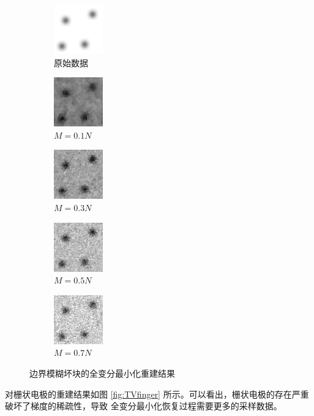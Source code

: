 \begin{figure}
\centering
\begin{subfigure}[t]{1.1in}
	\includegraphics{Figure/testdata/2dsmooth.png}
	\caption{原始数据}
\end{subfigure}
\begin{subfigure}[t]{1.1in}
	\includegraphics{Figure/TV/2dsmooth10.png}
	\caption{$M = 0.1 N$}
\end{subfigure}
\begin{subfigure}[t]{1.1in}
	\includegraphics{Figure/TV/2dsmooth30.png}
	\caption{$M = 0.3 N$}
\end{subfigure}
\begin{subfigure}[t]{1.1in}
	\includegraphics{Figure/TV/2dsmooth50.png}
	\caption{$M = 0.5 N$}
\end{subfigure}
\begin{subfigure}[t]{1.1in}
	\includegraphics{Figure/TV/2dsmooth70.png}
	\caption{$M = 0.7 N$}
\end{subfigure}
\caption{边界模糊坏块的全变分最小化重建结果}
\label{fig:TV2dsmooth}
\end{figure}

对栅状电极的重建结果如图 \ref{fig:TVfinger}
所示。可以看出，栅状电极的存在严重破坏了梯度的稀疏性，导致
全变分最小化恢复过程需要更多的采样数据。

